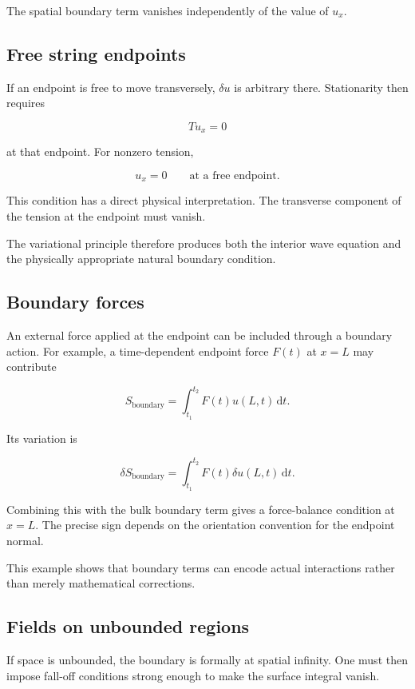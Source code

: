 The spatial boundary term vanishes independently of the value of \(u_{x}\).

\subsection{Free string endpoints}

If an endpoint is free to move transversely, \(\delta u\) is arbitrary there. Stationarity then requires

\[
T u_{x}=0
\]

at that endpoint. For nonzero tension,

\[
\boxed{
u_{x}=0
\qquad
\text{at a free endpoint}
}.
\]

This condition has a direct physical interpretation. The transverse component of the tension at the endpoint must vanish.

The variational principle therefore produces both the interior wave equation and the physically appropriate natural boundary condition.

\subsection{Boundary forces}

An external force applied at the endpoint can be included through a boundary action. For example, a time-dependent endpoint force \(F(t)\) at \(x=L\) may contribute

\[
S_{\mathrm{boundary}}
=
\int_{t_{1}}^{t_{2}}
F(t)u(L,t)
\,\mathrm{d}t.
\]

Its variation is

\[
\delta S_{\mathrm{boundary}}
=
\int_{t_{1}}^{t_{2}}
F(t)\delta u(L,t)
\,\mathrm{d}t.
\]

Combining this with the bulk boundary term gives a force-balance condition at \(x=L\). The precise sign depends on the orientation convention for the endpoint normal.

This example shows that boundary terms can encode actual interactions rather than merely mathematical corrections.

\subsection{Fields on unbounded regions}

If space is unbounded, the boundary is formally at spatial infinity. One must then impose fall-off conditions strong enough to make the surface integral vanish.


